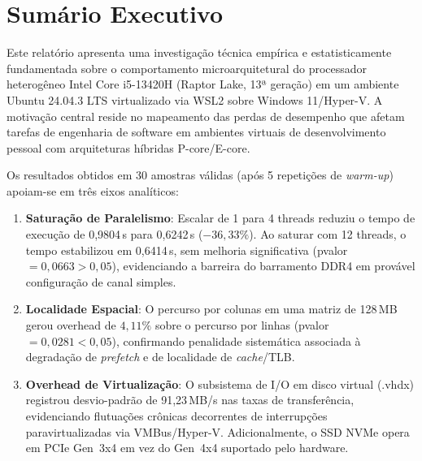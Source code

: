 \documentclass[
	12pt,
	openright,
	oneside,
	a4paper,
	english,
	brazil
	]{abntex2}
\begin{document}
\frenchspacing
\onehalfspacing

\imprimirfolhaderosto

\tableofcontents*
\cleardoublepage

\textual

\chapter{Sumário Executivo}
\label{chap:sumario_executivo}

Este relatório apresenta uma investigação técnica empírica e estatisticamente fundamentada sobre o comportamento microarquitetural do processador heterogêneo Intel Core i5-13420H (Raptor Lake, 13ª geração) em um ambiente Ubuntu 24.04.3 LTS virtualizado via WSL2 sobre Windows 11/Hyper-V. A motivação central reside no mapeamento das perdas de desempenho que afetam tarefas de engenharia de software em ambientes virtuais de desenvolvimento pessoal com arquiteturas híbridas P-core/E-core.

Os resultados obtidos em 30 amostras válidas (após 5 repetições de \textit{warm-up}) apoiam-se em três eixos analíticos:

\begin{enumerate}
    \item \textbf{Saturação de Paralelismo}: Escalar de 1 para 4 threads reduziu o tempo de execução de 0,9804\,s para 0,6242\,s ($-36{,}33\%$). Ao saturar com 12 threads, o tempo estabilizou em 0,6414\,s, sem melhoria significativa (p\text{-}valor $= 0{,}0663 > 0{,}05$), evidenciando a barreira do barramento DDR4 em provável configuração de canal simples.

    \item \textbf{Localidade Espacial}: O percurso por colunas em uma matriz de 128\,MB gerou overhead de $4{,}11\%$ sobre o percurso por linhas (p\text{-}valor $= 0{,}0281 < 0{,}05$), confirmando penalidade sistemática associada à degradação de \textit{prefetch} e de localidade de \textit{cache}/TLB.

    \item \textbf{Overhead de Virtualização}: O subsistema de I/O em disco virtual (.vhdx) registrou desvio-padrão de 91,23\,MB/s nas taxas de transferência, evidenciando flutuações crônicas decorrentes de interrupções paravirtualizadas via VMBus/Hyper-V. Adicionalmente, o SSD NVMe opera em PCIe Gen~3x4 em vez do Gen~4x4 suportado pelo hardware.
\end{enumerate}
\end{document}
